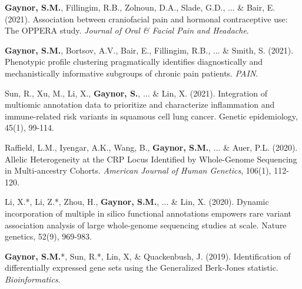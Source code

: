 

\begin{cvpapers}


\cvpaper
{\textbf{Gaynor, S.M.}, Fillingim, R.B., Zolnoun, D.A., Slade, G.D., ... \& Bair, E. (2021). Association between craniofacial pain and hormonal contraceptive use: The OPPERA study. \textit{Journal of Oral \& Facial Pain and Headache}.} %
{} %
{ } %
{} %

\cvpaper
{\textbf{Gaynor, S.M.}, Bortsov, A.V., Bair, E., Fillingim, R.B., ... \& Smith, S. (2021). Phenotypic profile clustering pragmatically identifies diagnostically and mechanistically informative subgroups of chronic pain patients. \textit{PAIN}.} %
{} %
{ } %
{} %

\cvpaper
{Sun, R., Xu, M., Li, X., \textbf{Gaynor, S.}, ... \& Lin, X. (2021). Integration of multiomic annotation data to prioritize and characterize inflammation and immune-related risk variants in squamous cell lung cancer. Genetic epidemiology, 45(1), 99-114.}
{} %
{ } %
{} %

\cvpaper
{Raffield, L.M., Iyengar, A.K., Wang, B., \textbf{Gaynor, S.M.}, ... \& Auer, P.L. (2020). Allelic Heterogeneity at the CRP Locus Identified by Whole-Genome Sequencing in Multi-ancestry Cohorts. \textit{American Journal of Human Genetics}, 106(1), 112-120.} %
{} %
{ } %
{} %

\cvpaper
{Li, X.*, Li, Z.*, Zhou, H., \textbf{Gaynor, S.M.}, ... \& Lin, X. (2020). Dynamic incorporation of multiple in silico functional annotations empowers rare variant association analysis of large whole-genome sequencing studies at scale. Nature genetics, 52(9), 969-983.}
{} %
{ } %
{} %

\cvpaper
{\textbf{Gaynor, S.M.}*, Sun, R.*, Lin, X, \& Quackenbush, J. (2019). Identification of differentially expressed gene sets using the Generalized Berk-Jones statistic. \textit{Bioinformatics}.} %
{} %
{ } %
{} %


\end{cvpapers}
